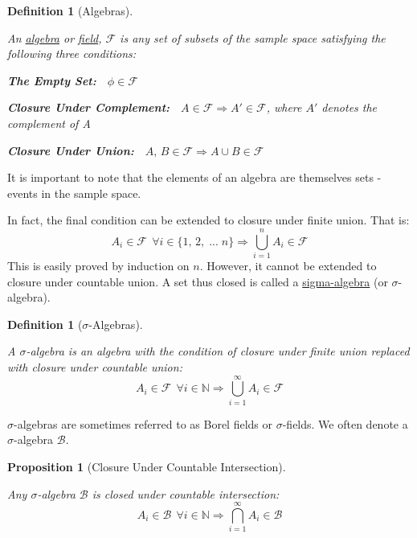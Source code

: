 \documentclass[12pt,a4paper]{article}
\newtheorem{defn}[thm]{Definition}
\newtheorem{prop}[thm]{Proposition}
\begin{document}
\begin{defn}[Algebras]$\;$\par
\vspace{12pt}

An \underline{algebra} or \underline{field}, $\mathcal{F}$ is any set of subsets of the sample space satisfying the following three conditions:\par
\vspace{10pt}
{\bf The Empty Set:}$\quad\phi\in\mathcal{F}$\par
\vspace{10pt}
{\bf Closure Under Complement:}$\quad A\in\mathcal{F}\Rightarrow A'\in\mathcal{F}$, where $A'$ denotes the complement of A\par
\vspace{10pt}
{\bf Closure Under Union:}$\quad A,\,B\in\mathcal{F}\Rightarrow A\cup B\in\mathcal{F}$\par
\vspace{12pt}
\end{defn}

\noindent It is important to note that the elements of an algebra are themselves sets - events in the sample space.\par
\vspace{12pt}

\noindent In fact, the final condition can be extended to closure under finite union. That is:
$$A_i \in\mathcal{F}\:\:\forall i\in\{1,\,2,\;...\;n\}\Rightarrow\bigcup_{i=1}^{n}A_i\in\mathcal{F}$$
This is easily proved by induction on $n$. However, it cannot be extended to closure under countable union. A set thus closed is called a \underline{sigma-algebra} (or $\sigma$-algebra).

\begin{defn}[$\sigma$-Algebras]$\;$\par
\vspace{12pt}

A $\sigma$-algebra is an algebra with the condition of closure under finite union replaced with closure under countable union:
$$A_i\in\mathcal{F}\:\:\forall i\in\mathbb{N}\Rightarrow\bigcup_{i=1}^{\infty}A_i\in\mathcal{F}$$\end{defn}

\noindent $\sigma$-algebras are sometimes referred to as Borel fields or $\sigma$-fields. We often denote a $\sigma$-algebra $\mathcal{B}$.

\begin{prop}[Closure Under Countable Intersection]$\;$\par
\vspace{12pt}

Any $\sigma$-algebra $\mathcal{B}$ is closed under countable intersection:
$$A_i\in\mathcal{B}\:\:\forall i\in\mathbb{N}\Rightarrow\bigcap_{i=1}^{\infty}A_i\in\mathcal{B}$$\end{prop}
\end{document}
